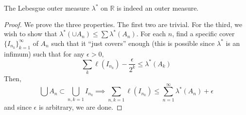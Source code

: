   \begin{lemma}
    The Lebesgue outer measure $\lambda^\ast$ on $\mathbb{R}$ is indeed an outer measure. 
  \end{lemma} 
  \begin{proof}
    We prove the three properties. The first two are trivial. For the third, we wish to show that $\lambda^\ast ( \cup A_n) \leq \sum \lambda^\ast (A_n)$. For each $n$, find a specific cover $\{I_{n_k}\}_{k=1}^\infty$ of $A_n$ such that it ``just covers'' enough (this is possible since $\lambda^\ast$ is an infimum) such that for any $\epsilon > 0$, 
    \begin{equation}
      \sum_k \ell(I_{n_k}) - \frac{\epsilon}{2^k} \leq \lambda^\ast (A_k)
    \end{equation} 
    Then, 
    \begin{equation}
      \bigcup A_n \subset \bigcup_{n, k = 1} I_{n_k} \implies \sum_{n, k = 1} \ell(I_{n_k}) \leq \sum_{n=1}^\infty \lambda^\ast (A_n) + \epsilon
    \end{equation}
    and since $\epsilon$ is arbitrary, we are done. 


\end{proof}
